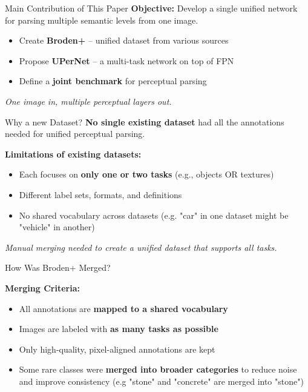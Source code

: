\documentclass{beamer}
\begin{document}

\begin{frame}{Main Contribution of This Paper}
  \textbf{Objective:} Develop a single unified network for parsing multiple semantic levels from one image.

  \vspace{0.5cm}

  \begin{itemize}
    \item Create \textbf{Broden+} – unified dataset from various sources
    \item Propose \textbf{UPerNet} – a multi-task network on top of FPN
    \item Define a \textbf{joint benchmark} for perceptual parsing
  \end{itemize}

  \vfill
  \textit{One image in, multiple perceptual layers out.}
\end{frame}


\begin{frame}{Why a new Dataset?}
  \textbf{No single existing dataset} had all the annotations needed for unified perceptual parsing.
  \vspace{0.4cm}

  \textbf{Limitations of existing datasets:}
  \begin{itemize}
    \item Each focuses on \textbf{only one or two tasks} (e.g., objects OR textures)
    \item Different label sets, formats, and definitions
    \item No shared vocabulary across datasets (e.g. "car" in one dataset might be "vehicle" in another)
  \end{itemize}
  \vfill
  \textit{Manual merging needed to create a unified dataset that supports all tasks.}
\end{frame}

\begin{frame}{How Was Broden+ Merged?}
  
  \textbf{Merging Criteria:}
  \begin{itemize}
    \item All annotations are \textbf{mapped to a shared vocabulary}
    \item Images are labeled with \textbf{as many tasks as possible}
    \item Only high-quality, pixel-aligned annotations are kept
    \item Some rare classes were \textbf{merged into broader categories} to reduce noise and improve consistency (e.g "stone" and "concrete" are merged into "stone")
  \end{itemize}
\end{frame}
\end{document}
